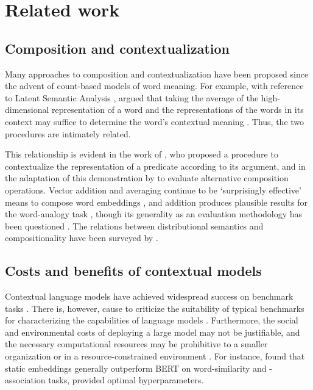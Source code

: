 \section{Related work}
\label{sec:related-work}

\subsection{Composition and contextualization}

Many approaches to composition and contextualization have been proposed since the
advent of count-based models of word meaning.
For example, with reference to Latent Semantic Analysis \parencites{Deerwester1990},
\citeauthor{Landauer1997} argued that taking the average of the high-dimensional
representation of a word and the representations of the words in its context may
suffice to determine the word's contextual meaning \parencites*[229-230]{Landauer1997}.
Thus, the two procedures are intimately related.

This relationship is evident in the work of \textcites{Kintsch2001}, who proposed a
procedure to contextualize the representation of a predicate according to its argument,
and in the adaptation of this demonstration by \textcites{Mitchell2008} to evaluate
alternative composition operations.
Vector addition and averaging continue to be `surprisingly effective' means to compose
word embeddings \parencites[10]{Boleda2020}, and addition produces plausible results
for the word-analogy task \parencites[9]{Mikolov2013}[7]{Mikolov2013a}, though its
generality as an evaluation methodology has been questioned
\parencites[1300]{Lenci2022}.
The relations between distributional semantics and compositionality have been surveyed
by \textcites{Erk2012}{Clark2015}{Boleda2016}.

\subsection{Costs and benefits of contextual models}

Contextual language models have achieved widespread success on benchmark tasks
\parencites[22-27]{Bommasani2022}.
There is, however, cause to criticize the suitability of typical benchmarks for
characterizing the capabilities of language models \parencites[5-6]{Srivastava2023}.
Furthermore, the social and environmental costs of deploying a large model may not be
justifiable, and the necessary computational resources may be prohibitive to a smaller
organization or in a resource-constrained environment
\parencites[142-145,154]{Bommasani2022}.
For instance, \textcites{Lenci2022} found that static embeddings generally outperform
BERT \parencites{Devlin2019} on word-similarity and -association tasks, provided
optimal hyperparameters.

